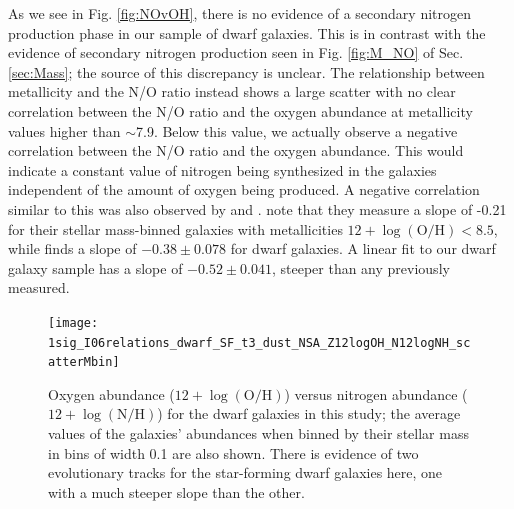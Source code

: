 As we see in Fig. \ref{fig:NOvOH}, there is no evidence of a secondary nitrogen 
production phase in our sample of dwarf galaxies.  This is in contrast with the 
evidence of secondary nitrogen production seen in Fig. \ref{fig:M_NO} of Sec. 
\ref{sec:Mass}; the source of this discrepancy is unclear.  The relationship 
between metallicity and the N/O ratio instead shows a large scatter with no 
clear correlation between the N/O ratio and the oxygen abundance at metallicity 
values higher than $\sim$7.9.  Below this value, we actually observe a negative 
correlation between the N/O ratio and the oxygen abundance.  This would indicate 
a constant value of nitrogen being synthesized in the galaxies independent of 
the amount of oxygen being produced.  A negative correlation similar to this was 
also observed by \cite{Andrews13} and \cite{Douglass17b}.   \cite{Andrews13} 
note that they measure a slope of -0.21 for their stellar mass-binned galaxies 
with metallicities $12 + \log(\text{O}/\text{H}) < 8.5$, while 
\cite{Douglass17b} finds a slope of $-0.38\pm 0.078$ for dwarf galaxies.  A 
linear fit to our dwarf galaxy sample has a slope of $-0.52\pm 0.041$, steeper 
than any previously measured.

\begin{figure}
    \texttt{[image: 1sig\_I06relations\_dwarf\_SF\_t3\_dust\_NSA\_Z12logOH\_N12logNH\_scatterMbin]}
    \caption{Oxygen abundance ($12 + \log \left(\text{O}/\text{H}\right)$) 
    versus nitrogen abundance ($12 + \log \left(\text{N}/\text{H}\right)$) for 
    the dwarf galaxies in this study; the average values of the galaxies' 
    abundances when binned by their stellar mass in bins of width 0.1 are also 
    shown.  There is evidence of two evolutionary tracks for the star-forming 
    dwarf galaxies here, one with a much steeper slope than the other.}
    \label{fig:OvN}
\end{figure}

